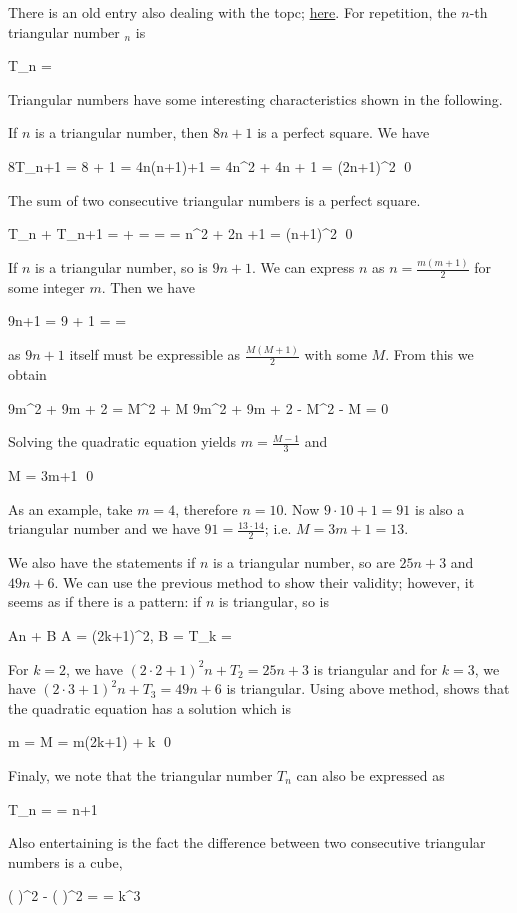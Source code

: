 
There is an old entry also dealing with the topc; \href{2015-10-08:entry}{here}. For repetition, the $n$-th triangular number $_n$ is

\bee
T_n = 
\eee

Triangular numbers have some interesting characteristics shown in the following.


If $n$ is a triangular number, then $8n+1$ is a perfect square. We have

\bee
8T_n+1 = 8  + 1 = 4n(n+1)+1 = 4n^2 + 4n + 1 = (2n+1)^2 \qed
\eee

The sum of two consecutive triangular numbers is a perfect square.

\bee
T_n + T_{n+1} =  +  =  =  = n^2 + 2n +1 = (n+1)^2 \qed
\eee

If $n$ is a triangular number, so is $9n+1$. We can express $n$ as $n = \frac{m(m+1)}{2}$ for some integer $m$. Then we have

\bee
9n+1 = 9  + 1 =  = 
\eee

as $9n+1$ itself must be expressible as $\frac{M(M+1)}{2}$ with some $M$. From this we obtain

\bee
9m^2 + 9m + 2 = M^2 + M \rightarrow 9m^2 + 9m + 2 - M^2 - M = 0
\eee

Solving the quadratic equation yields $m = \frac{M-1}{3}$ and

\bee
M = 3m+1 \qed
\eee

As an example, take $m=4$, therefore $n = 10$. Now $9\cdot 10+1 = 91$ is also a triangular number and we have $91 = \frac{13 \cdot 14}{2}$; i.e. $M = 3m+1 = 13$.

We also have the statements if $n$ is a triangular number, so are $25n+3$ and $49n+6$. We can use the previous method to show their validity; however, it seems as if there is a pattern: if $n$ is triangular, so is

\bee
An + B \quad {} \quad A = (2k+1)^2, B = T_k = 
\eee

For $k=2$, we have $(2 \cdot 2 + 1)^2 n + T_2 = 25n + 3$ is triangular and for $k=3$, we have $(2 \cdot 3 + 1)^2 n + T_3 = 49n + 6$ is triangular. Using above method, shows that the quadratic equation has a solution which is

\bee
m =  \rightarrow M = m(2k+1) + k \qed
\eee


Finaly, we note that the triangular number $T_n$ can also be expressed as

\bee
T_n =  = {n+1 }
\eee

Also entertaining is the fact the difference between two consecutive triangular numbers is a cube,

\bee
\left(  \right)^2 - \left(  \right)^2 = \cdots = k^3
\eee

